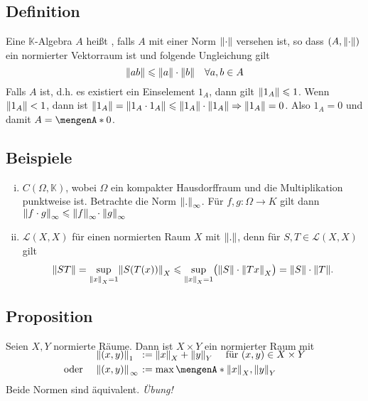 \subsection[Definition: Normierte $\mathds{K}$-Algebra]{Definition} %
\label{sub:210}
Eine $\mathds{K}$-Algebra $A$ heißt , falls $A$ mit einer Norm $\norm{\cdot}$ versehen ist, so dass $(A,\norm{\cdot})$ 
ein normierter Vektorraum ist und folgende Ungleichung gilt
\[
	\norm{a b} \le \norm{a} \cdot \norm{b} \quad \forall a,b \in A   
\]
Falls $A$  ist, d.h. es existiert ein Einselement $1_A$, dann gilt $\norm{1_A} \le 1$.
Wenn $\norm{1_A} < 1$, dann ist $\norm{1_A} = \norm{1_A \cdot 1_A} \le \norm{1_A} \cdot \norm{1_A} \Rightarrow \norm{1_A} =0 $. Also $1_A=0$ und damit $A= \set{0}$.

\subsection[Beispiele für normierte Algebren]{Beispiele} %
\label{sub:211}
\begin{enumerate}[(i)]
	\item $C(\Omega,\mathds{K})$, wobei $\Omega$ ein kompakter Hausdorffraum und die Multiplikation punktweise ist. Betrachte die Norm $\norm[\infty]{.}$. Für 
	$f,g \colon \Omega \to K$ gilt dann $\norm[\infty]{f \cdot g} \le \norm[\infty]{f} \!\cdot \norm[\infty]{g}$
	\item $\mathcal{L}(X,X)$ für einen normierten Raum $X$ mit $\norm{.}$, denn für $S,T \in \mathcal{L}(X,X)$ gilt
	\[
		\norm{S T} = \sup_{\norm[X]{x}=1} \norm[X]{S(T(x))} \le \sup_{\norm[X]{x}=1} \enbrace[\big]{\norm{S} \cdot \norm[X]{Tx}} = \norm{S} \cdot \norm{T}.     
	\]
\end{enumerate}

\subsection[Proposition: Norm auf dem Produkt normierter Räume]{Proposition} %
\label{sub:212}
Seien $X,Y$ normierte Räume. Dann ist $X \times Y$ ein normierter Raum mit 
\begin{align*}\SwapAboveDisplaySkip
	 \norm[\minwidthbox{1\hfill}{1em}]{(x,y)} &:= \norm[X]{x} + \norm[Y]{y}   \quad \text{ für } (x,y) \in X \times Y \\
	\text{oder } \quad \norm[\minwidthbox{\infty}{1em}]{(x,y)} &:= \max \set{\norm[X]{x}, \norm[Y]{y}}  
\end{align*}
Beide Normen sind äquivalent.
\emph{Übung!} \bewende

